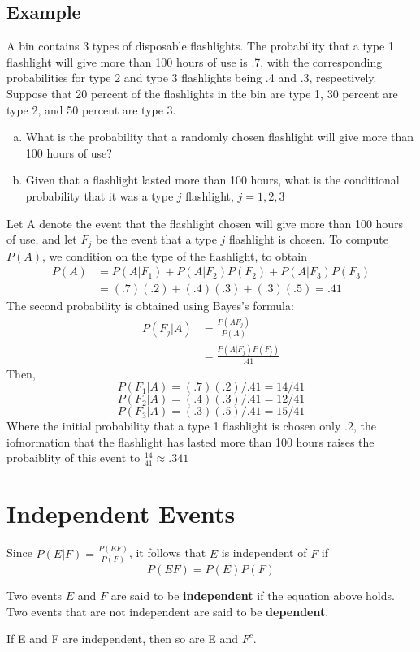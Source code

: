 \subsection*{Example}
A bin contains 3 types of disposable flashlights. The probability that a type 1
flashlight will give more than 100 hours of use is .7, with the corresponding
probabilities for type 2 and type 3 flashlights being .4 and .3, respectively.
Suppose that 20 percent of the flashlights in the bin are type 1, 30 percent are
type 2, and 50 percent are type 3.
\begin{enumerate}[a. ]
    \item What is the probability that a randomly chosen flashlight will give more
than 100 hours of use?
    \item Given that a flashlight lasted more than 100 hours, what is the conditional
probability that it was a type $j$ flashlight, $j=1,2,3$
\end{enumerate}
Let A denote the event that the flashlight chosen will give more than 100 hours of use, and let $F_j$ be the event that a type $j$ flashlight is chosen. To compute $P(A)$, we condition on the type of the flashlight, to obtain
\begin{equation*}
    \begin{split}
        P(A) &= P(A|F_1) + P(A|F_2)P(F_2) + P(A|F_3)P(F_3)\\
        &= (.7)(.2)+(.4)(.3)+(.3)(.5) = .41
    \end{split}
\end{equation*}
The second probability is obtained using Bayes's formula:
\begin{equation*}
    \begin{split}
        P(F_j|A)&=\frac{P(AF_j)}{P(A)}\\
        &= \frac{P(A|F_j)P(F_j)}{.41}
    \end{split}
\end{equation*}
Then, 
\[P(F_1|A) = (.7)(.2)/.41 = 14/41\]
\[P(F_2|A) = (.4)(.3)/.41 = 12/41\]
\[P(F_3|A) = (.3)(.5)/.41 = 15/41\]
Where the initial probability that a type 1 flashlight is chosen only .2, the iofnormation that the flashlight has lasted more than 100 hours raises the probaiblity of this event to $\frac{14}{41}\approx .341$
\section{Independent Events}
Since $P(E|F) = \frac{P(EF)}{P(F)}$, it follows that $E$ is independent of $F$ if
\[P(EF) = P(E)P(F)\]
\begin{definition}
Two events $E$ and $F$ are said to be \textbf{independent} if the equation above holds. Two events that are not independent are said to be \textbf{dependent}.
\end{definition}
\begin{lemma}
If E and F are independent, then so are E and $F^c$.
\end{lemma}
